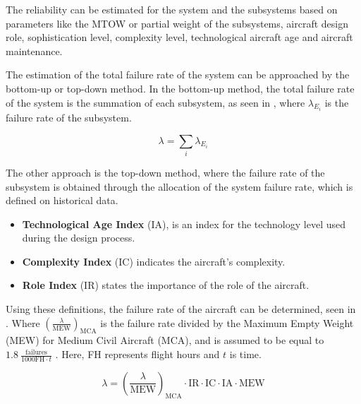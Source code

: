 The reliability can be estimated for the system and the subsystems based on parameters like the MTOW or partial weight of the subsystems, aircraft design role, sophistication level, complexity level, technological aircraft age and aircraft maintenance.

The estimation of the total failure rate of the system can be approached by the bottom-up or top-down method.
In the bottom-up method, the total failure rate of the system is the summation of each subsystem, as seen in , where $\lambda_{E_{i}}$ is the failure rate of the subsystem.

\begin{equation}
    \label{eq:fail_rate}
    \lambda = \sum_{i} \lambda_{E_{i}}
\end{equation}

The other approach is the top-down method, where the failure rate of the subsystem is obtained through the allocation of the system failure rate, which is defined on historical data. 

\begin{itemize}
    \item \textbf{Technological Age Index} (IA), is an index for the technology level used during the design process.
    \item \textbf{Complexity Index} (IC) indicates the aircraft’s complexity.
    \item \textbf{Role Index} (IR) states the importance of the role of the aircraft.
\end{itemize}
Using these definitions, the failure rate of the aircraft can be determined, seen in .
Where \(\left( \frac{\lambda}{\text{MEW}} \right)_{\text{MCA}}\) is the failure rate divided by the Maximum Empty Weight (MEW) for Medium Civil Aircraft (MCA), and is assumed to be equal to \(\qty{1.8}{\frac{\text{failures}}{1000 \text{FH} \cdot t}}\) \cite{giovingo2019rams}.
Here, FH represents flight hours and \(t\) is time.

\begin{equation}
\label{eq:LambdaTopdown}
    \lambda = \left ( \frac{\lambda}{\text{MEW}} \right )_\text{MCA} \cdot \text{IR} \cdot \text{IC} \cdot \text{IA} \cdot \text{MEW}
\end{equation}

